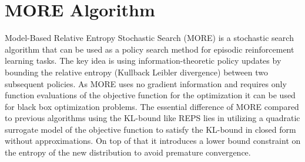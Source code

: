 %
%
%
%
%
%

\section{MORE Algorithm}
Model-Based Relative Entropy Stochastic Search
(MORE) \citep{abdolmaleki2015model} is a
stochastic search algorithm that can be used
as a policy search method for episodic reinforcement
learning tasks. The key idea is
using information-theoretic policy updates
by bounding the relative entropy (Kullback Leibler divergence)
between two subsequent policies.
As MORE uses no gradient information and requires only function evaluations
of the objective function for the optimization it can be used
for black box optimization problems.
The essential difference of MORE compared to previous algorithms using
the KL-bound like REPS \citep{peters2010relative} lies in utilizing
a quadratic surrogate model of the objective function
to  satisfy the KL-bound in closed form without approximations.
On top of that it
introduces a lower bound constraint on the entropy of the new distribution
to avoid premature convergence.


